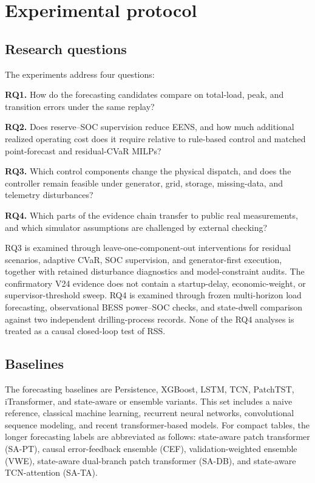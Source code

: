 \section{Experimental protocol}\label{experimental-protocol}

\subsection{Research questions}\label{research-questions}

The experiments address four questions:

\textbf{RQ1.} How do the forecasting candidates compare on total-load,
peak, and transition errors under the same replay?

\textbf{RQ2.} Does reserve--SOC supervision reduce EENS, and how much
additional realized operating cost does it require relative to rule-based
control and matched point-forecast and residual-CVaR MILPs?

\textbf{RQ3.} Which control components change the physical dispatch, and does
the controller remain feasible under generator, grid, storage, missing-data,
and telemetry disturbances?

\textbf{RQ4.} Which parts of the evidence chain transfer to public real
measurements, and which simulator assumptions are challenged by external
checking?

RQ3 is examined through leave-one-component-out interventions for residual
scenarios, adaptive CVaR, SOC supervision, and generator-first execution,
together with retained disturbance diagnostics and model-constraint audits.
The confirmatory V24 evidence does not contain a startup-delay, economic-weight,
or supervisor-threshold sweep. RQ4 is examined through frozen multi-horizon load
forecasting, observational BESS power--SOC checks, and state-dwell comparison
against two independent drilling-process records. None of the RQ4 analyses is
treated as a causal closed-loop test of RSS.

\subsection{Baselines}\label{baselines}

The forecasting baselines are Persistence, XGBoost, LSTM, TCN, PatchTST,
iTransformer, and state-aware or ensemble variants. This set includes a
naive reference, classical machine learning, recurrent neural networks,
convolutional sequence modeling, and recent transformer-based models.
For compact tables, the longer forecasting labels are abbreviated as follows:
state-aware patch transformer (SA-PT), causal error-feedback ensemble (CEF),
validation-weighted ensemble (VWE), state-aware dual-branch patch transformer
(SA-DB), and state-aware TCN-attention (SA-TA).

